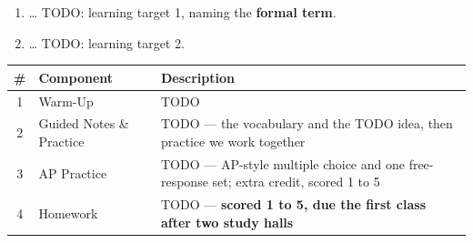 \documentclass[12pt]{article}
\begin{document}

\vspace*{0.56in}
\namedateperiod
\vspace{0.12in}

\begin{learningtargetbox}
\small
\begin{enumerate}[leftmargin=1.5em, itemsep=5pt]
  \item \ldots{} TODO: learning target 1, naming the \textbf{formal term}.
  \item \ldots{} TODO: learning target 2.
\end{enumerate}
\end{learningtargetbox}

\vspace{0.14in}

\begin{tocbox}
\small
\renewcommand{\arraystretch}{1.5}
\begin{tabularx}{\linewidth}{@{} c l X @{}}
\rowcolor{sky}
\textbf{\#} & \textbf{Component} & \textbf{Description} \\
\midrule
1 & Warm-Up    & TODO \\
2 & Guided Notes \& Practice & TODO --- the vocabulary and the TODO idea, then practice we
                 work together \\
3 & AP Practice & TODO --- AP-style multiple choice and one free-response set; extra credit,
                 scored 1 to 5 \\
4 & Homework   & TODO --- \textbf{scored 1 to 5, due the first class after two study halls} \\
\end{tabularx}
\end{tocbox}
\end{document}
